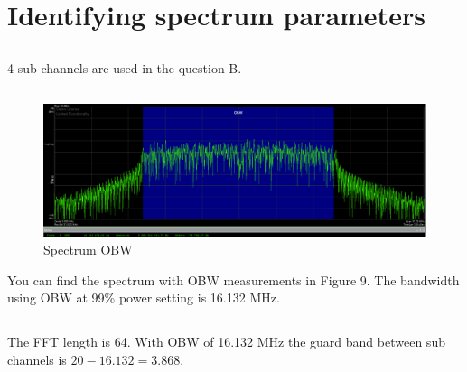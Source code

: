\documentclass{article}
\begin{document}
\section{Identifying spectrum parameters}
\subsection{}

4 sub channels are used in the question B.

\subsection{}
\begin{figure}[htb!]
    \centering
    \includegraphics[scale=0.30]{obw-spectrum}
    \caption{Spectrum OBW}
\end{figure}

You can find the spectrum with OBW measurements in Figure 9. The bandwidth using OBW at 99\% power setting is 16.132 MHz.

\subsection{}
The FFT length is 64. With OBW of 16.132 MHz the guard band between sub channels is $20 - 16.132=3.868$.
\end{document}
